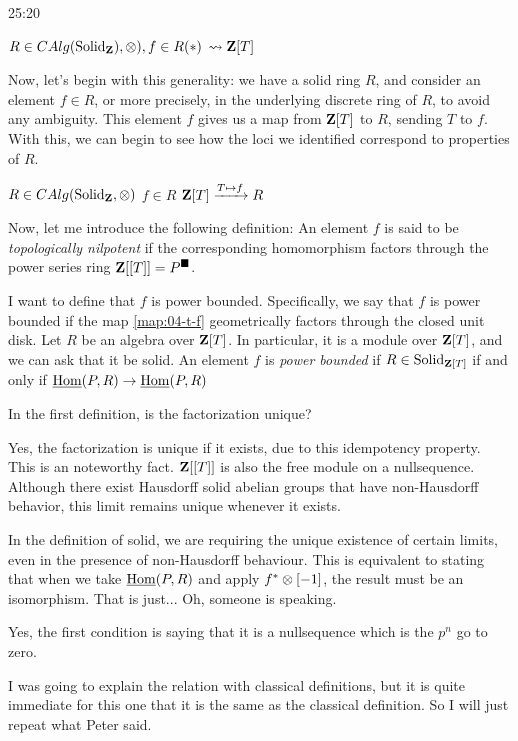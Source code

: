 \begin{unfinished}{25:20}
\begin{goal}
\end{goal}


$R \in CAlg(\mathrm{Solid}_{\mathbf Z}), \otimes), f \in R (\ast)$
$\leadsto \mathbf Z[T] $


Now, let's begin with this generality: we have a solid ring $R$, and consider an element $f \in R$, or more precisely, in the underlying discrete ring of $R$, to avoid any ambiguity. This element $f$ gives us a map from $\mathbf Z[T]$ to $R$, sending $T$ to $f$. With this, we can begin to see how the loci we identified correspond to properties of $R$.

$R \in CAlg(\mathrm{Solid}_\mathbf Z, \otimes)$
$f \in R$
$\mathbf Z[T] \xrightarrow{T \mapsto f} R$ \label{map:07-t-f}

Now, let me introduce the following definition:
An element $f$ is said to be \textit{topologically nilpotent} if the corresponding homomorphism factors through the power series ring $\mathbf Z[[T]] = P^\blacksquare$.
\ed

I want to define that $f$ is power bounded.  Specifically, we say that $f$ is power bounded if the map \ref{map:04-t-f} geometrically factors through the closed unit disk. Let $R$ be an algebra over $\mathbf Z[T]$. In particular, it is a module over $\mathbf Z[T]$, and we can ask that it be solid.
An element $f$ is \textit{power bounded} if $R \in \mathrm{Solid}_{\mathbf Z[T]}$ if and only if $\operatorname{\underline{Hom}}(P, R) \to \operatorname{\underline{Hom}}(P, R)$ %
\ed

%
\ques In the first definition, is the factorization unique?

\ans Yes, the factorization is unique if it exists, due to this idempotency property. This is an noteworthy fact. $\mathbf Z[[T]]$ is also the free module on a nullsequence. 
Although there exist Hausdorff solid abelian groups that have non-Hausdorff behavior, this limit remains unique whenever it exists.

In the definition of solid, we are requiring the unique existence of certain limits, even in the presence of non-Hausdorff behaviour. This is equivalent to stating that when we take $\operatorname{\underline{Hom}}(P, R)$ and apply $f^{\ast} \otimes [-1]$, the result must be an isomorphism. That is just... Oh, someone is speaking.

%
Yes, the first condition is saying that it is a nullsequence which is the $p^n$ go to zero. 

I was going to explain the relation with classical definitions, but it is quite immediate for this one that it is the same as the classical definition. So I will just repeat what Peter said. 


\end{unfinished}
